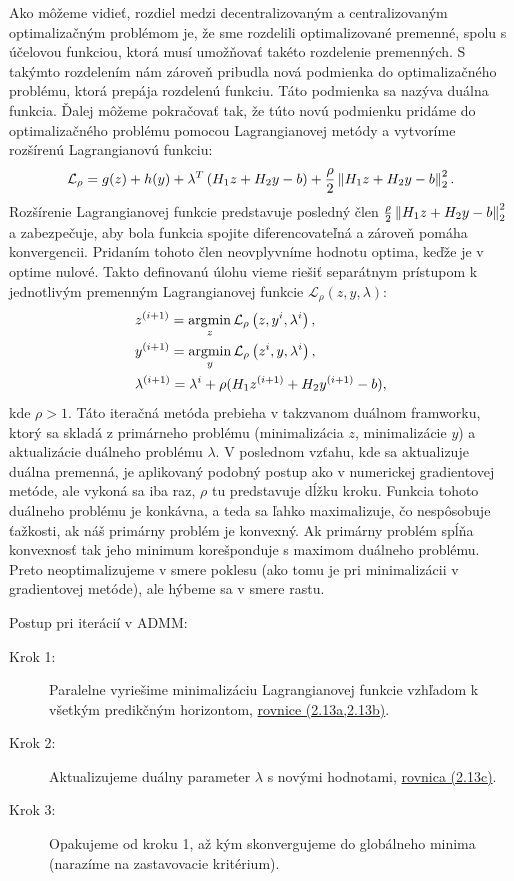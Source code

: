 Ako môžeme vidieť, rozdiel medzi decentralizovaným a centralizovaným optimalizačným problémom je, že sme rozdelili optimalizované premenné, spolu s účelovou funkciou, ktorá musí umožňovať takéto rozdelenie premenných. S takýmto rozdelením nám zároveň pribudla nová podmienka do optimalizačného problému, ktorá prepája rozdelenú funkciu. Táto podmienka sa nazýva duálna funkcia. 
Ďalej môžeme pokračovať tak, že túto novú podmienku pridáme do optimalizačného problému pomocou Lagrangianovej metódy a vytvoríme rozšírenú Lagrangianovú funkciu:
\begin{equation}
	\mathcal{L}_{\rho} = g(z) + h(y) + \lambda^{T}\left(  H_{1}z + H_{2}y - b \right) + \frac{\rho}{2} \left\lVert H_{1}z + H_{2}y - b\right\rVert_{2}^{2}.
\end{equation}
Rozšírenie Lagrangianovej funkcie predstavuje posledný člen $\frac{\rho}{2} \left\lVert H_{1}z + H_{2}y - b\right\rVert_{2}^{2}$ a zabezpečuje, aby bola funkcia spojite diferencovateľná a zároveň pomáha konvergencii. Pridaním tohoto člen neovplyvníme hodnotu optima, keďže je v optime nulové. Takto definovanú úlohu vieme riešiť separátnym prístupom k jednotlivým premenným Lagrangianovej funkcie $\mathcal{L}_{\rho} \left(z,y,\lambda \right)$:
\label{math:ADMM_iteracie}
\begin{subequations}
	\begin{align}
		&z^{(i+1)} = \operatorname*{argmin}_{z} \mathcal{L}_{\rho} \left(z,y^{i},\lambda^{i} \right),\\
		&y^{(i+1)} = \operatorname*{argmin}_{y} \mathcal{L}_{\rho} \left(z^{i},y,\lambda^{i} \right),\\
		&\lambda^{(i+1)} = \lambda^{i} + \rho( H_{1}z^{(i+1)} + H_{2}y^{(i+1)} - b ),
	\end{align}
\end{subequations}
kde $\rho > 1$. Táto iteračná metóda prebieha v takzvanom duálnom framworku, ktorý sa skladá z primárneho problému (minimalizácia $z$, minimalizácie $y$) a aktualizácie duálneho problému $\lambda$. V poslednom vzťahu, kde sa aktualizuje duálna premenná, je aplikovaný podobný postup ako v numerickej gradientovej metóde, ale vykoná sa iba raz, $\rho$ tu predstavuje dĺžku kroku. Funkcia tohoto duálneho problému je konkávna, a teda sa ľahko maximalizuje, čo nespôsobuje ťažkosti, ak náš primárny problém je konvexný. Ak primárny problém spĺňa konvexnosť tak jeho minimum korešponduje s maximom duálneho problému. Preto neoptimalizujeme v smere poklesu (ako tomu je pri minimalizácii v gradientovej metóde), ale hýbeme sa v smere rastu\cite{bib1}. 
\label{subse:ADMM2}

Postup pri iterácií v ADMM:
\begin{description}
	\item[Krok 1:] {Paralelne vyriešime minimalizáciu Lagrangianovej funkcie vzhľadom k všetkým predikčným horizontom, \hyperref[math:ADMM_iteracie]{rovnice (2.13a,2.13b)}.}
	\item[Krok 2:] {Aktualizujeme duálny parameter $\lambda$ s novými hodnotami, \hyperref[math:ADMM_iteracie]{rovnica (2.13c)}.}
	\item[Krok 3:] {Opakujeme od kroku 1, až kým skonvergujeme do globálneho minima (narazíme na zastavovacie kritérium).}
\end{description}

